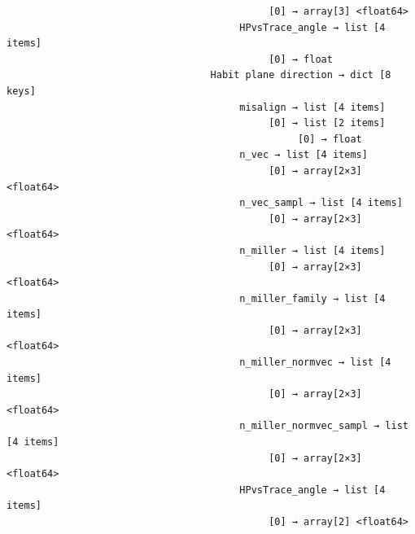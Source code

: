 \documentclass[a4paper,10pt]{article}
\begin{document}
\begin{verbatim}
                                             [0] → array[3] <float64>
                                        HPvsTrace_angle → list [4 items]
                                             [0] → float
                                   Habit plane direction → dict [8 keys]
                                        misalign → list [4 items]
                                             [0] → list [2 items]
                                                  [0] → float
                                        n_vec → list [4 items]
                                             [0] → array[2×3] <float64>
                                        n_vec_sampl → list [4 items]
                                             [0] → array[2×3] <float64>
                                        n_miller → list [4 items]
                                             [0] → array[2×3] <float64>
                                        n_miller_family → list [4 items]
                                             [0] → array[2×3] <float64>
                                        n_miller_normvec → list [4 items]
                                             [0] → array[2×3] <float64>
                                        n_miller_normvec_sampl → list [4 items]
                                             [0] → array[2×3] <float64>
                                        HPvsTrace_angle → list [4 items]
                                             [0] → array[2] <float64>
\end{verbatim}
\end{document}

